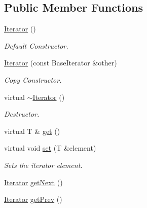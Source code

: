 \subsection*{Public Member Functions}
\begin{DoxyCompactItemize}
\item 
\hyperlink{classDE_1_1List_1_1Iterator_aa670317eef61968df15fe4ec1b721817}{Iterator} ()\hypertarget{classDE_1_1List_1_1Iterator_aa670317eef61968df15fe4ec1b721817}{}\label{classDE_1_1List_1_1Iterator_aa670317eef61968df15fe4ec1b721817}

\begin{DoxyCompactList}\small\item\em Default Constructor. \end{DoxyCompactList}\item 
\hyperlink{classDE_1_1List_1_1Iterator_aec3de14e44866dc96439a44e484756bd}{Iterator} (const Base\+Iterator \&other)
\begin{DoxyCompactList}\small\item\em Copy Constructor. \end{DoxyCompactList}\item 
virtual \hyperlink{classDE_1_1List_1_1Iterator_ac255f2279f9a20b0f494d37961cba484}{$\sim$\+Iterator} ()\hypertarget{classDE_1_1List_1_1Iterator_ac255f2279f9a20b0f494d37961cba484}{}\label{classDE_1_1List_1_1Iterator_ac255f2279f9a20b0f494d37961cba484}

\begin{DoxyCompactList}\small\item\em Destructor. \end{DoxyCompactList}\item 
virtual T \& \hyperlink{classDE_1_1List_1_1Iterator_a4e83d04d4bc5e7715cf8535be70f8796}{get} ()
\item 
virtual void \hyperlink{classDE_1_1List_1_1Iterator_a76effe78048f7c8b0b7b7cc9e24044be}{set} (T \&element)
\begin{DoxyCompactList}\small\item\em Sets the iterator element. \end{DoxyCompactList}\item 
\hyperlink{classDE_1_1List_1_1Iterator}{Iterator} \hyperlink{classDE_1_1List_1_1Iterator_ae74a3fdd51d427c989adee0fbe218c3c}{get\+Next} ()
\item 
\hyperlink{classDE_1_1List_1_1Iterator}{Iterator} \hyperlink{classDE_1_1List_1_1Iterator_a335fea104b4908acad300498de017156}{get\+Prev} ()
\end{DoxyCompactItemize}


